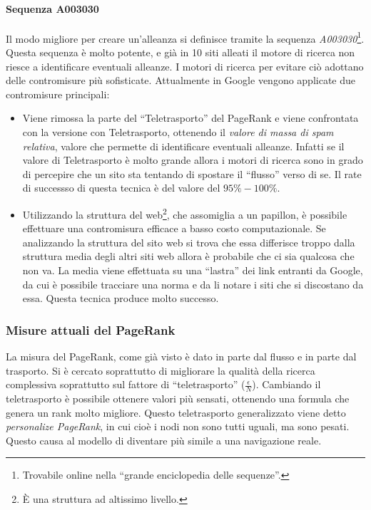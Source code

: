 \paragraph*{Sequenza A003030}Il modo migliore per creare un'alleanza si definisce tramite la sequenza \textit{A003030}\footnote{Trovabile online nella ``grande enciclopedia delle sequenze''.}. Questa sequenza \`e molto potente, e gi\`a in 10 siti alleati il motore di ricerca non riesce a identificare eventuali alleanze. I motori di ricerca per evitare ci\`o adottano delle contromisure pi\`u sofisticate. Attualmente in Google vengono applicate due contromisure principali:
\begin{itemize}

\item Viene rimossa la parte del ``Teletrasporto'' del PageRank e viene confrontata con la versione con Teletrasporto, ottenendo il \textit{valore di massa di spam relativa}, valore che permette di identificare eventuali alleanze. Infatti se il valore di Teletrasporto \`e molto grande allora i motori di ricerca sono in grado di percepire che un sito sta tentando di spostare il ``flusso'' verso di se. Il rate di successso di questa tecnica \`e del valore del $95\%-100\%$.

\item Utilizzando la struttura del web\footnote{\`E una struttura ad altissimo livello.}, che assomiglia a un papillon, \`e possibile effettuare una contromisura efficace a basso costo computazionale. Se analizzando la struttura del sito web si trova che essa differisce troppo dalla struttura media degli altri siti web allora \`e probabile che ci sia qualcosa che non va. La media viene effettuata su una ``lastra'' dei link entranti da Google, da cui \`e possibile tracciare una norma e da li notare i siti che si discostano da essa. Questa tecnica produce molto successo.

\end{itemize}

\subsubsection{Misure attuali del PageRank}
La misura del PageRank, come gi\`a visto \`e dato in parte dal flusso e in parte dal trasporto. Si \`e cercato soprattutto di migliorare la qualit\`a della ricerca complessiva soprattutto sul fattore di ``teletrasporto'' ($\frac{\epsilon}{N}$).
Cambiando il teletrasporto \`e possibile ottenere valori pi\`u sensati, ottenendo una formula che genera un rank molto migliore. Questo teletrasporto generalizzato viene detto \textit{personalize PageRank}, in cui cio\`e i nodi non sono tutti uguali, ma sono pesati. Questo causa al modello di diventare pi\`u simile a una navigazione reale.

